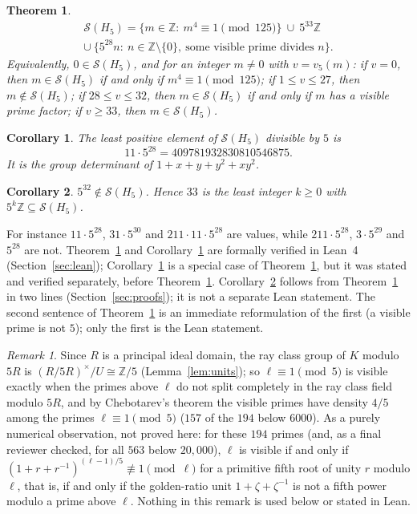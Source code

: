 \documentclass[11pt]{article}
\newtheorem{theorem}{Theorem}
\newtheorem{corollary}{Corollary}
\theoremstyle{definition}
\theoremstyle{remark}
\newtheorem{remark}{Remark}
\newcommand{\Z}{\mathbb Z}
\newcommand{\cS}{\mathcal S}
\begin{document}
\begin{theorem}\label{thm:main}
\begin{multline*}
\cS(H_5)=\{m\in\Z:\ m^4\equiv1\!\!\pmod{125}\}\ \cup\ 5^{33}\Z\\
\cup\ \{5^{28}n:\ n\in\Z\setminus\{0\},\ \text{some visible prime divides } n\}.
\end{multline*}
Equivalently, $0\in\cS(H_5)$, and for an integer $m\ne0$ with $v=v_5(m)$:
if $v=0$, then $m\in\cS(H_5)$ if and only if $m^4\equiv1\pmod{125}$; if
$1\le v\le27$, then $m\notin\cS(H_5)$; if $28\le v\le32$, then
$m\in\cS(H_5)$ if and only if $m$ has a visible prime factor; if $v\ge33$, then
$m\in\cS(H_5)$.
\end{theorem}

\begin{corollary}\label{cor:min}
The least positive element of $\cS(H_5)$ divisible by $5$ is
\[11\cdot5^{28}=409781932830810546875.\]
It is the group determinant of $1+x+y+y^2+xy^2$.
\end{corollary}

\begin{corollary}\label{cor:33}
$5^{32}\notin\cS(H_5)$. Hence $33$ is the least integer $k\ge0$ with
$5^k\Z\subseteq\cS(H_5)$.
\end{corollary}

For instance $11\cdot5^{28}$, $31\cdot5^{30}$ and $211\cdot11\cdot5^{28}$ are
values, while $211\cdot5^{28}$, $3\cdot5^{29}$ and $5^{28}$ are not.
Theorem~\ref{thm:main} and Corollary~\ref{cor:min} are formally verified in
Lean~4 (Section~\ref{sec:lean}); Corollary~\ref{cor:min} is a special case of
Theorem~\ref{thm:main}, but it was stated and verified separately, before
Theorem~\ref{thm:main}. Corollary~\ref{cor:33} follows from
Theorem~\ref{thm:main} in two lines (Section~\ref{sec:proofs}); it is not a
separate Lean statement. The second sentence of Theorem~\ref{thm:main} is an
immediate reformulation of the first (a visible prime is not $5$); only the
first is the Lean statement.

\begin{remark}\label{rem:cft}
Since $R$ is a principal ideal domain, the ray class group of $K$ modulo $5R$ is
$(R/5R)^\times/U\cong\Z/5$ (Lemma~\ref{lem:units}); so $\ell\equiv1\pmod5$ is
visible exactly when the primes above $\ell$ do not split completely in the
ray class field modulo $5R$, and by Chebotarev's theorem the visible primes
have density $4/5$ among the primes $\ell\equiv1\pmod5$ ($157$ of the $194$
below $6000$). As a purely numerical observation, not proved here: for these
$194$ primes (and, as a final reviewer checked, for all $563$ below $20{,}000$),
$\ell$ is visible if and only if $(1+r+r^{-1})^{(\ell-1)/5}\not\equiv1\pmod\ell$
for a primitive fifth root of unity $r$ modulo $\ell$, that is, if and only if
the golden-ratio unit $1+\zeta+\zeta^{-1}$ is not a fifth power modulo a prime
above $\ell$. Nothing in this remark is used below or stated in Lean.
\end{remark}
\end{document}
